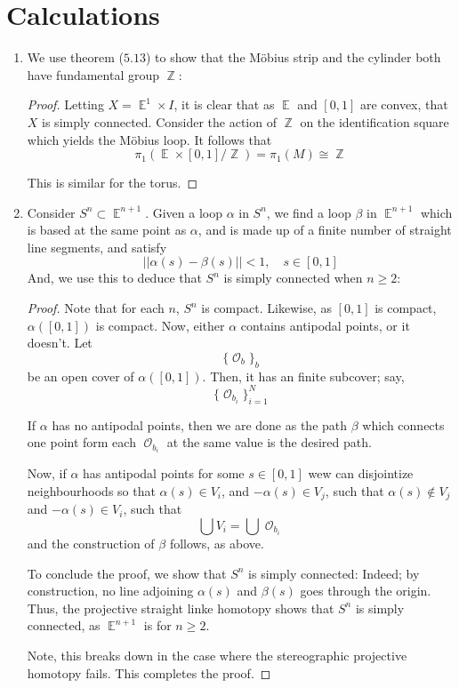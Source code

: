 \documentclass{book}
\DeclareMathOperator*{\E}{\mathbb{E}}
\DeclareMathOperator*{\Ocal}{\mathcal{O}}
\DeclareMathOperator*{\Z}{\mathbb{Z}}
\begin{document}
\section{Calculations}
\begin{enumerate}[(1)]
    \item We use theorem ($5.13$) to show that the M\"obius strip and the cylinder both have fundamental group $\Z$: 
        \begin{proof} Letting $X = \E^1 \times I$, it is clear that as $\E$ and $[0,1]$ are convex, that $X$ is simply connected. Consider the action of $\Z$ on the identification square which yields the M\"obius loop. It follows that 
            \[\pi_1( \E \times [0,1] / \Z) = \pi_1(M) \cong \Z\]
            \par This is similar for the torus. 
        \end{proof}

    \item Consider $S^n \subset \E^{n+1}$. Given a loop $\alpha$ in $S^n$, we find a loop $\beta$ in $\E^{n+1}$ which is based at the same point as $\alpha$, and is made up of a finite number of straight line segments, and satisfy 
        \[|| \alpha(s) - \beta(s)|| < 1, \quad s \in [0,1]\]
        And, we use this to deduce that $S^n$ is simply connected when $n \geq 2$: 
        \begin{proof} Note that for each $n$, $S^n$ is compact. Likewise, as $[0,1]$ is compact, $\alpha([0,1])$ is compact. Now, either $\alpha$ contains antipodal points, or it doesn't. Let 
            \[\{ \Ocal_b\}_b\]
            be an open cover of $\alpha([0,1])$. Then, it has an finite subcover; say, 
            \[\{ \Ocal_{b_i}\}_{i=1}^N\]
            \par If $\alpha$ has no antipodal points, then we are done as the path $\beta$ which connects one point form each $\Ocal_{b_i}$ at the same value is the desired path. 
            \par Now, if $\alpha$ has antipodal points for some $s \in [0,1]$ wew can disjointize neighbourhoods so that $\alpha(s) \in V_i$, and $-\alpha(s) \in V_j$, such that $\alpha(s) \notin V_j$ and $-\alpha(s) \in V_i$, such that 
            \[\bigcup V_i = \bigcup \Ocal_{b_i}\]
            and the construction of $\beta$ follows, as above. 
            \par To conclude the proof, we show that $S^n$ is simply connected: Indeed; by construction, no line adjoining $\alpha(s)$ and $\beta(s)$ goes through the origin. Thus, the projective straight linke homotopy shows that $S^n$ is simply connected, as $\E^{n+1}$ is for $n \geq 2$. 
            \par Note, this breaks down in the case where the  stereographic projective homotopy fails. This completes the proof. 
        \end{proof}


\end{enumerate}
\end{document}

